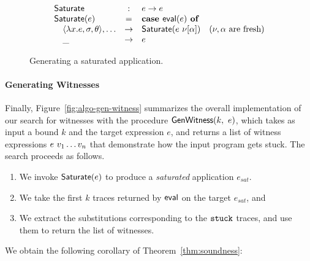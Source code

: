 \begin{figure}[t]
$$
\begin{array}{lclr}
\mathsf{Saturate}   & : & e \rightarrow e \\
\mathsf{Saturate}(e) & = & \mbox{\textbf{case }} \mathsf{eval}(e) \mbox{\textbf{ of}} \\
 \quad \langle \lambda x. e, \sigma, \theta \rangle,\ldots &\rightarrow& \mathsf{Saturate}(e\ \nu[\alpha]) & (\nu, \alpha \mbox{ are fresh}) \\
 \quad \_ &\rightarrow& e \\
\end{array}
$$
\caption{Generating a saturated application.}
\label{fig:algo-gen-args}

\end{figure}

\paragraph{Generating Witnesses}
%
Finally, Figure~\ref{fig:algo-gen-witness} summarizes the overall
implementation of our search for witnesses with the procedure
$\mathsf{GenWitness}(k,\ e)$, which takes as input a bound $k$ and the
target expression $e$, and returns a list of witness expressions
$e\ v_1 \ldots v_n$ that demonstrate how the input program
gets stuck.
%
The search proceeds as follows.
%
\begin{enumerate}
  \item We invoke $\mathsf{Saturate}(e)$ to produce a \emph{saturated}
        application $e_{sat}$.

  \item We take the first $k$ traces returned by $\mathsf{eval}$
        on the target $e_{sat}$, and

  \item We extract the substitutions corresponding to the
        $\mathtt{stuck}$ traces, and use them to return the list
        of witnesses.
\end{enumerate}
%
We obtain the following corollary of Theorem~\ref{thm:soundness}:


